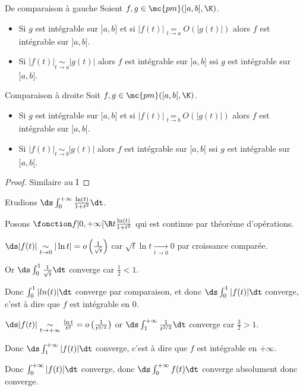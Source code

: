 \begin{theoreme}{De comparaison à gauche}{}
    Soient $f, g \in \mc {pm}(]a, b], \K)$. 
    
    \begin{itemize}
        \item Si $g$ est intégrable sur $]a, b]$ et si $|f(t)| \underset{t \to a   }{= } O(|g(t)|)$
    alors $f$ est intégrable sur $]a, b]$.
        \item Si $|f(t)| \underset{t \to a   }{\sim } |g(t)|$ alors $f$ est intégrable sur $]a, b]$ ssi $g$ est intégrable sur $]a, b]$.
    \end{itemize}
\end{theoreme}

\begin{theoreme}{Comparaison à droite}{}
    Soit $f, g \in \mc{pm}([a, b[, \K)$. 
    
    \begin{itemize}
        \item Si $g$ est intégrable sur $[a, b[$ et si $|f(t)| \underset{t \to b   }{= } O(|g(t)|)$
    alors $f$ est intégrable sur $[a, b[$.
        \item Si $|f(t)| \underset{t \to b   }{\sim } |g(t)|$ alors $f$ est intégrable sur $[a, b[$ ssi $g$ est intégrable sur $[a, b[$.
    \end{itemize}
\end{theoreme}

\begin{proof}
    Similaire au I
\end{proof}

\begin{exemple}
    Etudions $\ds \int_{0}^{+ \infty   } \frac{\ln (t)}{1 + t^2} \dt$. 

    Posons $\fonction f {]0, + \infty[}{\R}{t}{\frac{\ln (t)}{1 + t^2}}$ qui est continue par théorème d'opérations.


    \svspace $\ds |f(t)| \underset{t \to 0   }{\sim } |\ln t| = o \left( \frac 1 {\sqrt t} \right)$
    car $\sqrt t \ln t \xrightarrow[t \to 0 ]{} 0$ par croissance comparée. 

    Or $\ds \int_{0}^{1 } \frac 1 {\sqrt t} \dt$ converge car $\frac 1 2 < 1$. 

    Donc $\int_0^1 |ln(t) | \dt$ converge par comparaison, et donc 
    $\ds \int_{0}^{1 } |f(t)| \dt$ converge, c'est à dire que $f$ est intégrable en $0$.


    \svspace $\ds |f(t)| \underset{t \to + \infty   }{\sim } \frac{\ln t}{t^2} = o \left( \frac 1 {t^{3/2}} \right)$
    or $\ds \int_{1 }^{+ \infty   } \frac 1 {t^{3/2}} \dt$ converge car $\frac 3 2 > 1$.

    Donc $\ds \int_{1 }^{+ \infty   } |f(t)| \dt$ converge, c'est à dire que $f$ est intégrable en $+ \infty$.

    Donc $\int_0^{+ \infty} | f(t) | \dt$ converge, donc $\ds \int_{0}^{+ \infty   } f(t) \dt$ converge absolument donc converge.
\end{exemple}

